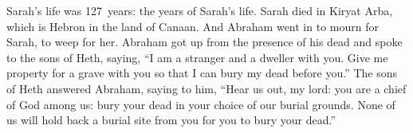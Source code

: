 
\begin{inparaenum}
     Sarah's life was 127~years: the years of Sarah's life.%
     Sarah died in Kiryat Arba, which is Hebron in the land of Canaan. And Abraham went in to mourn for Sarah, to weep for her.%
     Abraham got up from the presence of his dead and spoke to the sons of Heth, saying,%
     ``I am a stranger and a dweller with you. Give me property for a grave with you so that I can bury my dead before you.''%
     The sons of Heth answered Abraham, saying to him,%
     ``Hear us out, my lord: you are a chief of God among us: bury your dead in your choice of our burial grounds. None of us will hold back a burial site from you for you to bury your dead.''%
\end{inparaenum}
